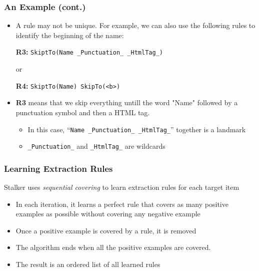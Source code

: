 \documentclass[svgnames]{beamer}
\begin{document}

\begin{frame} \frametitle{An Example (cont.)}
  
  \begin{itemize}
  \item A rule may not be unique. For example, we can also use the following
    rules to identify the beginning of the name:
    \begin{center}
      \textbf{R3:} \texttt{SkiptTo(Name \_Punctuation\_ \_HtmlTag\_)}
    \end{center}
    or
    \begin{center}
      \textbf{R4:} \texttt{SkiptTo(Name) SkipTo(<b>)}
    \end{center}
  \item \textbf{R3} means that we skip everything untill the word "Name" followed
    by a punctuation symbol and then a HTML tag.
    \begin{itemize}
    \item In this case, ``\texttt{Name \_Punctuation\_ \_HtmlTag\_}'' together
      is a landmark
    \item \texttt{\_Punctuation\_} and \texttt{\_HtmlTag\_} are wildcards
    \end{itemize}

  \end{itemize}

\end{frame}


\begin{frame} \frametitle{Learning Extraction Rules}
  
  Stalker uses \emph{sequential covering} to learn extraction rules for each
  target item
  \begin{itemize}
  \item In each iteration, it learns a perfect rule that covers as many
    positive examples as possible without covering any negative example
  \item Once a positive example is covered by a rule, it is removed
  \item The algorithm ends when all the positive examples are covered.
  \item The result is an ordered list of all learned rules
  \end{itemize}

\end{frame}
\end{document}
